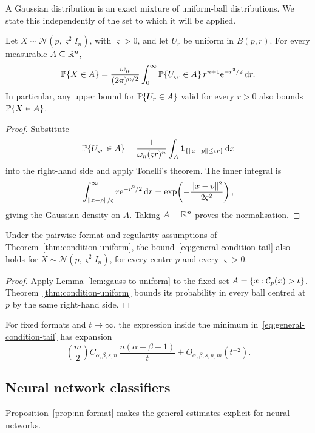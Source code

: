 A Gaussian distribution is an exact mixture of uniform-ball distributions. We state this independently of the set to which it will be applied.

\begin{lemma}\label{lem:gauss-to-uniform}
Let $X\sim\mathcal N(p,\varsigma^2 I_n)$, with $\varsigma>0$, and let $U_r$ be uniform in $B(p,r)$. For every measurable $A\subseteq\mathbb{R}^n$,
\begin{equation}\label{eq:gauss-to-uniform}
\operatorname*{\mathbb{P}}\{X\in A\}
=\frac{\omega_n}{(2\pi)^{n/2}}
\int_0^\infty\operatorname*{\mathbb{P}}\{U_{\varsigma r}\in A\}
\,r^{n+1}\mathrm{e}^{-r^2/2}\,\mathrm{d}{r}.
\end{equation}
In particular, any upper bound for $\operatorname*{\mathbb{P}}\{U_r\in A\}$ valid for every $r>0$ also bounds $\operatorname*{\mathbb{P}}\{X\in A\}$.
\end{lemma}

\begin{proof}
Substitute
\[
\operatorname*{\mathbb{P}}\{U_{\varsigma r}\in A\}
=\frac{1}{\omega_n(\varsigma r)^n}
\int_A\mathbf1_{\{\|x-p\|\le\varsigma r\}}\,\mathrm{d}{x}
\]
into the right-hand side and apply Tonelli's theorem. The inner integral is
\[
\int_{\|x-p\|/\varsigma}^\infty r\mathrm{e}^{-r^2/2}\,\mathrm{d}{r}
=\exp\!\left(-\frac{\|x-p\|^2}{2\varsigma^2}\right),
\]
giving the Gaussian density on $A$. Taking $A=\mathbb{R}^n$ proves the normalisation.
\end{proof}

\begin{theorem}\label{thm:condition-gaussian}
Under the pairwise format and regularity assumptions of Theorem~\ref{thm:condition-uniform}, the bound~\eqref{eq:general-condition-tail} also holds for $X\sim\mathcal N(p,\varsigma^2 I_n)$, for every centre $p$ and every $\varsigma>0$.
\end{theorem}

\begin{proof}
Apply Lemma~\ref{lem:gauss-to-uniform} to the fixed set $A=\{x:\mathcal{C}_p(x)>t\}$. Theorem~\ref{thm:condition-uniform} bounds its probability in every ball centred at $p$ by the same right-hand side.
\end{proof}

For fixed formats and $t\to\infty$, the expression inside the minimum in~\eqref{eq:general-condition-tail} has expansion
\[
\binom m2 C_{\alpha,\beta,s,n}\,
\frac{n(\alpha+\beta-1)}{t}+O_{\alpha,\beta,s,n,m}(t^{-2}).
\]

\subsection{Neural network classifiers}
Proposition~\ref{prop:nn-format} makes the general estimates explicit for neural networks.

